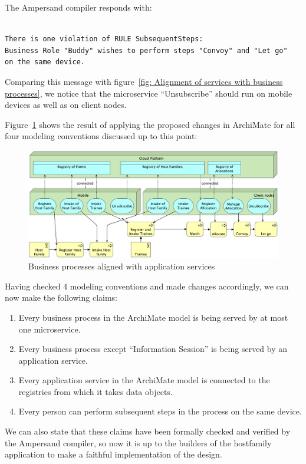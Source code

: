 \documentclass[sn-vancouver]{sn-jnl}%
\theoremstyle{thmstyleone}%
\theoremstyle{thmstyletwo}%
\theoremstyle{thmstylethree}%
\begin{document}
The Ampersand compiler responds with:

{\small
\begin{verbatim}

There is one violation of RULE SubsequentSteps:
Business Role "Buddy" wishes to perform steps "Convoy" and "Let go"
on the same device.

\end{verbatim}
}
Comparing this message with figure~\ref{fig: Alignment of services with business processes},
we notice that the microservice ``Unsubscribe'' should run on mobile devices as well as on client nodes.

Figure~\ref{fig: Adapted service alignment} shows the result of applying the proposed changes in ArchiMate for all four modeling conventions discussed up to this point:
\begin{figure}[hbtp]
  \centering
  \includegraphics[clip=true, scale=0.06]{Services na correcties.png}
  \caption{Business processes aligned with application services}
  \label{fig: Adapted service alignment}
\end{figure}

Having checked 4 modeling conventions and made changes accordingly, we can now make the following claims:
\begin{enumerate}
    \item Every business process in the ArchiMate model is being served by at most one microservice.
    \item Every business process except ``Information Session'' is being served by an application service.
    \item Every application service in the ArchiMate model is connected to the registries from which it takes data objects.
    \item Every person can perform subsequent steps in the process on the same device.
\end{enumerate}
We can also state that these claims have been formally checked and verified by the Ampersand compiler,
so now it is up to the builders of the hostfamily application to make a faithful implementation of the design.
\end{document}
